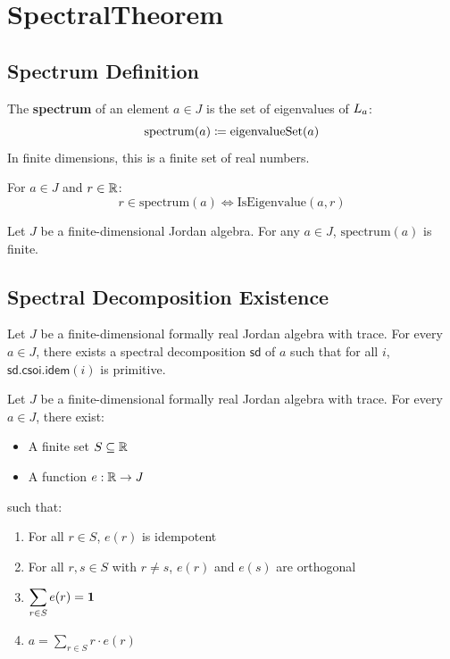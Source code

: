 \section{SpectralTheorem}

\subsection{Spectrum Definition}

\begin{definition}[spectrum]
The \textbf{spectrum} of an element $a \in J$ is the set of eigenvalues of $L_{a}$:
\[ \mathrm{spectrum}(a) \coloneqq \mathrm{eigenvalueSet}(a) \]
In finite dimensions, this is a finite set of real numbers.
\end{definition}

\begin{lemma}
For $a \in J$ and $r \in \mathbb{R}$:
\[ r \in \mathrm{spectrum}(a) \iff \mathrm{IsEigenvalue}(a, r) \]
\end{lemma}

\begin{theorem}
Let $J$ be a finite-dimensional Jordan algebra. For any $a \in J$, $\mathrm{spectrum}(a)$ is finite.
\end{theorem}

\subsection{Spectral Decomposition Existence}

\begin{theorem}
Let $J$ be a finite-dimensional formally real Jordan algebra with trace. For every $a \in J$, there exists a spectral decomposition $\mathsf{sd}$ of $a$ such that for all $i$, $\mathsf{sd}.\mathsf{csoi}.\mathsf{idem}(i)$ is primitive.
\end{theorem}

\begin{theorem}
Let $J$ be a finite-dimensional formally real Jordan algebra with trace. For every $a \in J$, there exist:
\begin{itemize}
  \item A finite set $S \subseteq \mathbb{R}$
  \item A function $e : \mathbb{R} \to J$
\end{itemize}
such that:
\begin{enumerate}
  \item For all $r \in S$, $e(r)$ is idempotent
  \item For all $r, s \in S$ with $r \ne s$, $e(r)$ and $e(s)$ are orthogonal
  \item $\displaystyle\sum_{r \in S} e(r) = \mathbf{1}$
  \item $\displaystyle a = \sum_{r \in S} r \cdot e(r)$
\end{enumerate}
\end{theorem}

